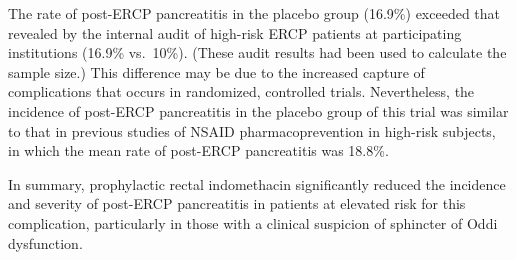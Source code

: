 \documentclass[
  10pt,
  letterpaper,
]{article}
\begin{document}
The rate of post-ERCP pancreatitis in the placebo group (16.9\%)
exceeded that revealed by the internal audit of high-risk ERCP patients
at participating institutions (16.9\% vs.~10\%). (These audit results
had been used to calculate the sample size.) This difference may be due
to the increased capture of complications that occurs in randomized,
controlled trials. Nevertheless, the incidence of post-ERCP pancreatitis
in the placebo group of this trial was similar to that in previous
studies of NSAID pharmacoprevention in high-risk subjects, in which the
mean rate of post-ERCP pancreatitis was 18.8\%.\citep{andriulli2007}

In summary, prophylactic rectal indomethacin significantly reduced the
incidence and severity of post-ERCP pancreatitis in patients at elevated
risk for this complication, particularly in those with a clinical
suspicion of sphincter of Oddi dysfunction.


\nolinenumbers
  
\end{document}
